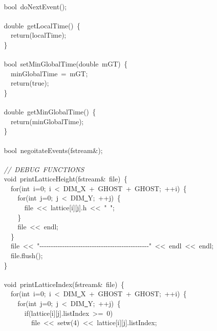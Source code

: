 {\ \\
\ \ bool\ doNextEvent();\\
\ \\
\ \ double\ getLocalTime()\ \{\\
\ \ \ \ return(localTime);\\
\ \ \}\\
\ \\
\ \ bool\ setMinGlobalTime(double\ mGT)\ \{\\
\ \ \ \ minGlobalTime\ =\ mGT;\\
\ \ \ \ return(true);\\
\ \ \}\\
\ \\
\ \ double\ getMinGlobalTime()\ \{\\
\ \ \ \ return(minGlobalTime);\\
\ \ \}\\
\ \\
\ \ bool\ negoitateEvents(fstream\&);\\
\ \\
\ \ \textsl{//\ DEBUG\ FUNCTIONS}\\
\ \ void\ printLatticeHeight(fstream\&\ file)\ \{\\
\ \ \ \ for(int\ i=0;\ i\ <{}\ DIM\underline\ X\ +\ GHOST\ +\ GHOST;\ ++i)\ \{\\
\ \ \ \ \ \ for(int\ j=0;\ j\ <{}\ DIM\underline\ Y;\ ++j)\ \{\\
\ \ \ \ \ \ \ \ file\ <{}<{}\ lattice[i][j].h\ <{}<{}\ "{}\ "{};\\
\ \ \ \ \ \ \}\\
\ \ \ \ \ \ file\ <{}<{}\ endl;\\
\ \ \ \ \}\\
\ \ \ \ file\ <{}<{}\ "{}-{}-{}-{}-{}-{}-{}-{}-{}-{}-{}-{}-{}-{}-{}-{}-{}-{}-{}-{}-{}-{}-{}-{}-{}-{}-{}-{}-{}-{}-{}-{}-{}-{}-{}-{}-{}-{}-{}-{}-{}-{}-{}-{}-{}-{}-{}-{}-{}"{}\ <{}<{}\ endl\ <{}<{}\ endl;\\
\ \ \ \ file.flush();\\
\ \ \}\\
\ \\
\ \ void\ printLatticeIndex(fstream\&\ file)\ \{\\
\ \ \ \ for(int\ i=0;\ i\ <{}\ DIM\underline\ X\ +\ GHOST\ +\ GHOST;\ ++i)\ \{\\
\ \ \ \ \ \ for(int\ j=0;\ j\ <{}\ DIM\underline\ Y;\ ++j)\ \{\\
\ \ \ \ \ \ \ \ if(lattice[i][j].listIndex\ >{}=\ 0)\\
\ \ \ \ \ \ \ \ \ \ file\ <{}<{}\ setw(4)\ <{}<{}\ lattice[i][j].listIndex;\\
}
